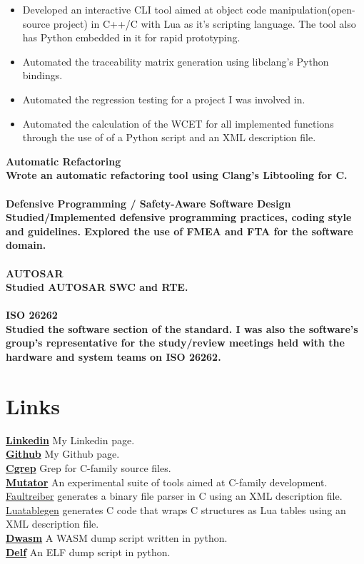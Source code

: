 \documentclass[8pt]{article}
\begin{document}
\begin{multicols}{2}
\begin{itemize}
\item Developed an interactive CLI tool aimed at object code manipulation(open-source project) in C++/C with Lua as it's scripting language. The tool also has Python embedded in it for rapid prototyping.
\item Automated the traceability matrix generation using libclang's Python bindings.
\item Automated the regression testing for a project I was involved in.
\item Automated the calculation of the WCET for all implemented functions through the use of of a Python script and an XML description file.
  \end{itemize}
  \bf Automatic Refactoring\\ \normalfont Wrote an automatic refactoring tool using Clang's Libtooling for C.\\[5pt]
  \\
  \bf Defensive Programming / Safety-Aware Software Design\\ \normalfont Studied/Implemented defensive programming practices, coding style and guidelines. Explored the use of FMEA and FTA for the software domain.\\[5pt]
  \\
  \bf AUTOSAR\\ \normalfont Studied AUTOSAR SWC and RTE.\\[5pt]
  \\
  \bf ISO 26262\\ \normalfont Studied the software section of the standard. I was also the software's group's representative for the study/review meetings held with the hardware and system teams on ISO 26262.\\[5pt]

  \section*{Links}
  {\bf \href{https://ir.linkedin.com/in/farzad-sadeghi-08426277}{Linkedin}} My Linkedin page.\\[5pt]
  {\bf \href{https://github.com/bloodstalker}{Github}} My Github page.\\[5pt]
  {\bf \href{https://github.com/bloodstalker/cgrep}{Cgrep}} Grep for C-family source files.\\[5pt]
  {\bf \href{https://bloodstalker.github.io/mutator/}{Mutator}} An experimental suite of tools aimed at C-family development.\\[5pt]
  \href{https://github.com/bloodstalker/faultreiber}{Faultreiber} generates a binary file parser in C using an XML description file.\\[5pt]
  \href{https://github.com/bloodstalker/luatablegen}{Luatablegen} generates C code that wraps C structures as Lua tables using an XML description file.\\[5pt]
  {\bf \href{https://github.com/bloodstalker/dwasm}{Dwasm}} A WASM dump script written in python.\\[5pt]
  {\bf \href{https://github.com/bloodstalker/delf}{Delf}} An ELF dump script in python.\\[5pt]


\end{multicols}
\end{document}

